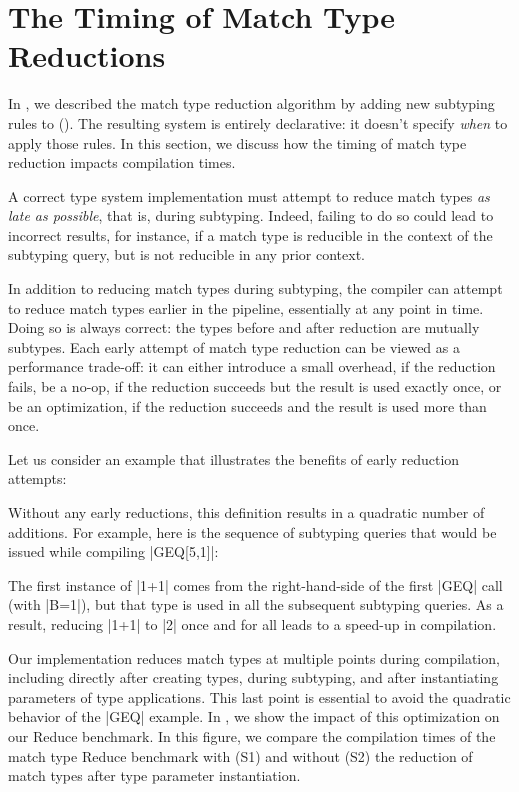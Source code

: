 \section{The Timing of Match Type Reductions}
\label{sec:the-timing-of-match-type-reductions}

In , we described the match type reduction algorithm by adding new subtyping rules to \SystemFsub ().
The resulting system is entirely declarative: it doesn't specify \emph{when} to apply those rules.
In this section, we discuss how the timing of match type reduction impacts compilation times.

A correct type system implementation must attempt to reduce match types \emph{as late as possible}, that is, during subtyping.
Indeed, failing to do so could lead to incorrect results, for instance, if a match type is reducible in the context of the subtyping query, but is not reducible in any prior context.

In addition to reducing match types during subtyping, the compiler can attempt to reduce match types earlier in the pipeline, essentially at any point in time.
Doing so is always correct: the types before and after reduction are mutually subtypes.
Each early attempt of match type reduction can be viewed as a performance trade-off: it can either introduce a small overhead, if the reduction fails, be a no-op, if the reduction succeeds but the result is used exactly once, or be an optimization, if the reduction succeeds and the result is used more than once.

Let us consider an example that illustrates the benefits of early reduction attempts:

\geqDefinition

\noindent
Without any early reductions, this definition results in a quadratic number of additions. For example, here is the sequence of subtyping queries that would be issued while compiling |GEQ[5,1]|:

\geqExample

\noindent
The first instance of |1+1| comes from the right-hand-side of the first |GEQ| call (with |B=1|), but that type is used in all the subsequent subtyping queries. As a result, reducing |1+1| to |2| once and for all leads to a speed-up in compilation.

Our implementation reduces match types at multiple points during compilation, including directly after creating types, during subtyping, and after instantiating parameters of type applications.
This last point is essential to avoid the quadratic behavior of the |GEQ| example.
In , we show the impact of this optimization on our Reduce benchmark.
In this figure, we compare the compilation times of the match type Reduce benchmark with (S1) and without (S2) the reduction of match types after type parameter instantiation.

